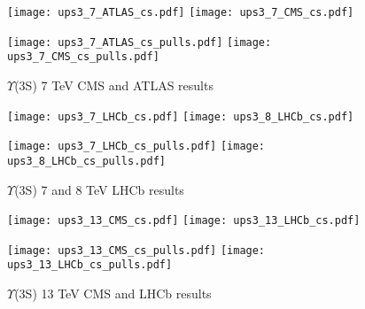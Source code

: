 \documentclass{article}
\begin{document}
\clearpage

\begin{figure}
\centering
\texttt{[image: ups3\_7\_ATLAS\_cs.pdf]}
\texttt{[image: ups3\_7\_CMS\_cs.pdf]}

\texttt{[image: ups3\_7\_ATLAS\_cs\_pulls.pdf]}
\texttt{[image: ups3\_7\_CMS\_cs\_pulls.pdf]}
\caption{$\Upsilon$(3S) 7 TeV CMS and ATLAS results}
\end{figure}

\clearpage

\begin{figure}
\centering
\texttt{[image: ups3\_7\_LHCb\_cs.pdf]}
\texttt{[image: ups3\_8\_LHCb\_cs.pdf]}

\texttt{[image: ups3\_7\_LHCb\_cs\_pulls.pdf]}
\texttt{[image: ups3\_8\_LHCb\_cs\_pulls.pdf]}
\caption{$\Upsilon$(3S) 7 and 8 TeV LHCb results}
\end{figure}

\clearpage

\begin{figure}
\centering
\texttt{[image: ups3\_13\_CMS\_cs.pdf]}
\texttt{[image: ups3\_13\_LHCb\_cs.pdf]}

\texttt{[image: ups3\_13\_CMS\_cs\_pulls.pdf]}
\texttt{[image: ups3\_13\_LHCb\_cs\_pulls.pdf]}
\caption{$\Upsilon$(3S) 13 TeV CMS and LHCb results}
\end{figure}


\clearpage
\restoregeometry



\pagebreak


\end{document}
